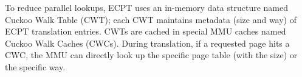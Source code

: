 
To reduce parallel lookups, 
	ECPT uses an in-memory data structure named Cuckoo Walk Table (CWT);
	each CWT
	maintains metadata (size and way) of ECPT translation entries.  
CWTs are cached in special MMU caches named Cuckoo Walk Caches (CWCs).
During translation, if a requested page hits a CWC, the MMU can directly look up the specific
	page table (with the size) or the specific way.






